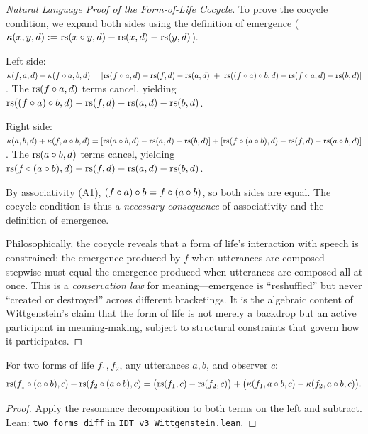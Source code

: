 \begin{proof}[Natural Language Proof of the Form-of-Life Cocycle]
To prove the cocycle condition, we expand both sides using the definition of
emergence ($\kappa(x, y, d) := \mathrm{rs}(x \circ y, d) - \mathrm{rs}(x, d) - \mathrm{rs}(y, d)$).

Left side: $\kappa(f, a, d) + \kappa(f \circ a, b, d) = [\mathrm{rs}(f \circ a, d)
- \mathrm{rs}(f, d) - \mathrm{rs}(a, d)] + [\mathrm{rs}((f \circ a) \circ b, d) - \mathrm{rs}(f \circ a, d)
- \mathrm{rs}(b, d)]$. The $\mathrm{rs}(f \circ a, d)$ terms cancel, yielding $\mathrm{rs}((f \circ a)
\circ b, d) - \mathrm{rs}(f, d) - \mathrm{rs}(a, d) - \mathrm{rs}(b, d)$.

Right side: $\kappa(a, b, d) + \kappa(f, a \circ b, d) = [\mathrm{rs}(a \circ b, d)
- \mathrm{rs}(a, d) - \mathrm{rs}(b, d)] + [\mathrm{rs}(f \circ (a \circ b), d) - \mathrm{rs}(f, d)
- \mathrm{rs}(a \circ b, d)]$. The $\mathrm{rs}(a \circ b, d)$ terms cancel, yielding
$\mathrm{rs}(f \circ (a \circ b), d) - \mathrm{rs}(f, d) - \mathrm{rs}(a, d) - \mathrm{rs}(b, d)$.

By associativity (A1), $(f \circ a) \circ b = f \circ (a \circ b)$,
so both sides are equal. The cocycle condition is thus a \emph{necessary consequence}
of associativity and the definition of emergence.

Philosophically, the cocycle reveals that a form of life's interaction with speech
is constrained: the emergence produced by $f$ when utterances are composed
stepwise must equal the emergence produced when utterances are composed all at
once. This is a \emph{conservation law} for meaning---emergence is ``reshuffled''
but never ``created or destroyed'' across different bracketings. It is the
algebraic content of Wittgenstein's claim that the form of life is not merely
a backdrop but an active participant in meaning-making, subject to structural
constraints that govern how it participates.
\end{proof}

\begin{theorem}
\label{thm:two-forms-diff}
For two forms of life $f_1, f_2$, any utterances $a, b$, and observer $c$:
\[
\mathrm{rs}(f_1 \circ (a \circ b), c) - \mathrm{rs}(f_2 \circ (a \circ b), c)
= \bigl(\mathrm{rs}(f_1, c) - \mathrm{rs}(f_2, c)\bigr)
  + \bigl(\kappa(f_1, a \circ b, c) - \kappa(f_2, a \circ b, c)\bigr).
\]
\end{theorem}

\begin{proof}
Apply the resonance decomposition to both terms on the left and subtract.
Lean: \texttt{two\_forms\_diff} in \texttt{IDT\_v3\_Wittgenstein.lean}.
\end{proof}

